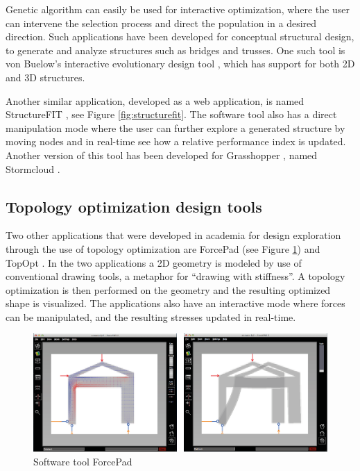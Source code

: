 Genetic algorithm can easily be used for interactive optimization, where the user can intervene the selection process and direct the population in a desired direction. Such applications have been developed for conceptual structural design, to generate and analyze structures such as bridges and trusses. One such tool is von Buelow’s interactive evolutionary design tool \cite{VonBuelow2008}, which has support for both 2D and 3D structures.

Another similar application, developed as a web application, is named StructureFIT \cite{Mueller2013, Mueller2015}, see Figure \ref{fig:structurefit}. The software tool also has a direct manipulation mode where the user can further explore a generated structure by moving nodes and in real-time see how a relative performance index is updated. Another version of this tool has been developed for Grasshopper \cite{Grasshopper}, named Stormcloud \cite{Danhaive2015}.

\subsection{Topology optimization design tools}
Two other applications that were developed in academia for design exploration through the use of topology optimization are ForcePad (see Figure \ref{fig:forcepad}) \cite{Lindemann2004} and TopOpt \cite{Aage2013}. In the two applications a 2D geometry is modeled by use of conventional drawing tools, a metaphor for “drawing with stiffness”. A topology optimization is then performed on the geometry and the resulting optimized shape is visualized. The applications also have an interactive mode where forces can be manipulated, and the resulting stresses updated in real-time.

\begin{figure}
  \includegraphics[width=350pt]{graphics/forcepad.png}
  \caption{Software tool ForcePad}
  \label{fig:forcepad}
\end{figure}
